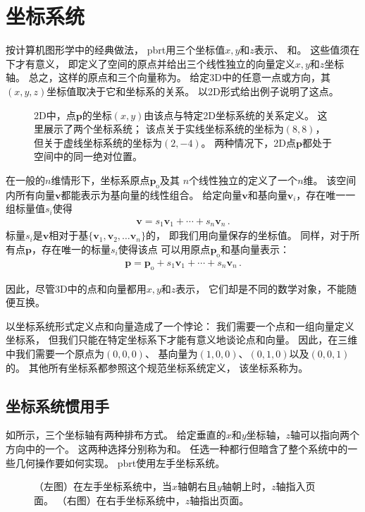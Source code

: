 \section{坐标系统}\label{sec:坐标系统}

按计算机图形学中的经典做法，
pbrt用三个坐标值$x,y$和$z$表示、
和。
这些值须在下才有意义，
即定义了空间的原点并给出三个线性独立的向量定义$x,y$和$z$坐标轴。
总之，这样的原点和三个向量称为。
给定3D中的任意一点或方向，其$(x,y,z)$坐标值取决于它和坐标系的关系。
以2D形式给出例子说明了这点。
\begin{figure}[htbp]
    \centering
    \caption{2D中，点$\bm p$的坐标$(x,y)$由该点与特定2D坐标系统的关系定义。
        这里展示了两个坐标系统；
        该点关于实线坐标系统的坐标为$(8,8)$，但关于虚线坐标系统的坐标为$(2,-4)$。
        两种情况下，2D点$\bm p$都处于空间中的同一绝对位置。}
    \label{fig:2.1}
\end{figure}

在一般的$n$维情形下，坐标系原点$\bm p_\mathrm{o}$及其
$n$个线性独立的定义了一个$n$维。
该空间内所有向量$\bm v$都能表示为基向量的线性组合。
给定向量$\bm v$和基向量$\bm v_i$，存在唯一一组标量值$s_i$使得
\begin{align*}
    \bm v=s_1\bm v_1+\cdots+s_n\bm v_n\, .
\end{align*}
标量$s_i$是$\bm v$相对于基$\{\bm v_1,\bm v_2,\ldots \bm v_n\}$的，
即我们用向量保存的坐标值。
同样，对于所有点$\bm p$，存在唯一的标量$s_i$使得该点
可以用原点$\bm p_\mathrm{o}$和基向量表示：
\begin{align*}
    \bm p=\bm p_\mathrm{o}+s_1\bm v_1+\cdots+s_n\bm v_n\, .
\end{align*}

因此，尽管3D中的点和向量都用$x,y$和$z$表示，
它们却是不同的数学对象，不能随便互换。

以坐标系统形式定义点和向量造成了一个悖论：
我们需要一个点和一组向量定义坐标系，
但我们只能在特定坐标系下才能有意义地谈论点和向量。
因此，在三维中我们需要一个原点为$(0,0,0)$、
基向量为$(1,0,0)$、$(0,1,0)$以及$(0,0,1)$
的。
其他所有坐标系都参照这个规范坐标系统定义，
该坐标系称为。

\subsection{坐标系统惯用手}\label{sub:坐标系统惯用手}
如所示，三个坐标轴有两种排布方式。
给定垂直的$x$和$y$坐标轴，$z$轴可以指向两个方向中的一个。
这两种选择分别称为和。
任选一种都行但暗含了整个系统中的一些几何操作要如何实现。
pbrt使用左手坐标系统。
\begin{figure}
    \centering
    \caption{（左图）在左手坐标系统中，当$x$轴朝右且$y$轴朝上时，$z$轴指入页面。
        （右图）在右手坐标系统中，$z$轴指出页面。}
    \label{fig:2.2}
\end{figure}